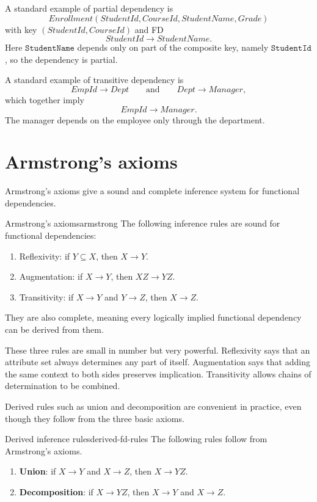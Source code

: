 \documentclass[11pt,a4paper,openany]{book}
\begin{document}
A standard example of partial dependency is
\[
Enrollment(StudentId, CourseId, StudentName, Grade)
\]
with key \((StudentId, CourseId)\) and FD
\[
StudentId \to StudentName.
\]
Here \(\texttt{StudentName}\) depends only on part of the composite key, namely \(\texttt{StudentId}\), so the dependency is partial.

A standard example of transitive dependency is
\[
EmpId \to Dept
\qquad\text{and}\qquad
Dept \to Manager,
\]
which together imply
\[
EmpId \to Manager.
\]
The manager depends on the employee only through the department.

\section{Armstrong's axioms}
Armstrong's axioms give a sound and complete inference system for functional dependencies.

\begin{theorem}{Armstrong's axioms}{armstrong}
The following inference rules are sound for functional dependencies:
\begin{enumerate}
\item Reflexivity: if \(Y \subseteq X\), then \(X \to Y\).
\item Augmentation: if \(X \to Y\), then \(XZ \to YZ\).
\item Transitivity: if \(X \to Y\) and \(Y \to Z\), then \(X \to Z\).
\end{enumerate}
They are also complete, meaning every logically implied functional dependency can be derived from them.
\end{theorem}

These three rules are small in number but very powerful. Reflexivity says that an attribute set always determines any part of itself. Augmentation says that adding the same context to both sides preserves implication. Transitivity allows chains of determination to be combined.

Derived rules such as union and decomposition are convenient in practice, even though they follow from the three basic axioms.

\begin{theorem}{Derived inference rules}{derived-fd-rules}
The following rules follow from Armstrong's axioms.
\begin{enumerate}
\item \textbf{Union}: if \(X \to Y\) and \(X \to Z\), then \(X \to YZ\).
\item \textbf{Decomposition}: if \(X \to YZ\), then \(X \to Y\) and \(X \to Z\).
\end{enumerate}
\end{theorem}
\end{document}
